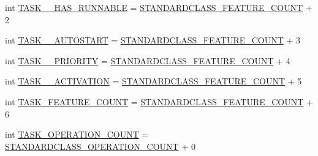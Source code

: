 \begin{DoxyCompactItemize}
\item 
int \hyperlink{interfaceshootingmachineemfmodel_1_1_shootingmachineemfmodel_package_a6dfa46683e73ddc332624916d8e636cf}{T\-A\-S\-K\-\_\-\-\_\-\-H\-A\-S\-\_\-\-R\-U\-N\-N\-A\-B\-L\-E} = \hyperlink{interfaceshootingmachineemfmodel_1_1_shootingmachineemfmodel_package_a14037f66989b3107e402142df96ee9aa}{S\-T\-A\-N\-D\-A\-R\-D\-C\-L\-A\-S\-S\-\_\-\-F\-E\-A\-T\-U\-R\-E\-\_\-\-C\-O\-U\-N\-T} + 2
\item 
int \hyperlink{interfaceshootingmachineemfmodel_1_1_shootingmachineemfmodel_package_aec71228b1f838eaeb86efe350e5b1a4f}{T\-A\-S\-K\-\_\-\-\_\-\-A\-U\-T\-O\-S\-T\-A\-R\-T} = \hyperlink{interfaceshootingmachineemfmodel_1_1_shootingmachineemfmodel_package_a14037f66989b3107e402142df96ee9aa}{S\-T\-A\-N\-D\-A\-R\-D\-C\-L\-A\-S\-S\-\_\-\-F\-E\-A\-T\-U\-R\-E\-\_\-\-C\-O\-U\-N\-T} + 3
\item 
int \hyperlink{interfaceshootingmachineemfmodel_1_1_shootingmachineemfmodel_package_a503bb84ed071da23eaa6ddf93697203e}{T\-A\-S\-K\-\_\-\-\_\-\-P\-R\-I\-O\-R\-I\-T\-Y} = \hyperlink{interfaceshootingmachineemfmodel_1_1_shootingmachineemfmodel_package_a14037f66989b3107e402142df96ee9aa}{S\-T\-A\-N\-D\-A\-R\-D\-C\-L\-A\-S\-S\-\_\-\-F\-E\-A\-T\-U\-R\-E\-\_\-\-C\-O\-U\-N\-T} + 4
\item 
int \hyperlink{interfaceshootingmachineemfmodel_1_1_shootingmachineemfmodel_package_acaa0d423bb2cc890173d67409494bd3d}{T\-A\-S\-K\-\_\-\-\_\-\-A\-C\-T\-I\-V\-A\-T\-I\-O\-N} = \hyperlink{interfaceshootingmachineemfmodel_1_1_shootingmachineemfmodel_package_a14037f66989b3107e402142df96ee9aa}{S\-T\-A\-N\-D\-A\-R\-D\-C\-L\-A\-S\-S\-\_\-\-F\-E\-A\-T\-U\-R\-E\-\_\-\-C\-O\-U\-N\-T} + 5
\item 
int \hyperlink{interfaceshootingmachineemfmodel_1_1_shootingmachineemfmodel_package_a7938b93e2769090ce3b4ef54dfb6345d}{T\-A\-S\-K\-\_\-\-F\-E\-A\-T\-U\-R\-E\-\_\-\-C\-O\-U\-N\-T} = \hyperlink{interfaceshootingmachineemfmodel_1_1_shootingmachineemfmodel_package_a14037f66989b3107e402142df96ee9aa}{S\-T\-A\-N\-D\-A\-R\-D\-C\-L\-A\-S\-S\-\_\-\-F\-E\-A\-T\-U\-R\-E\-\_\-\-C\-O\-U\-N\-T} + 6
\item 
int \hyperlink{interfaceshootingmachineemfmodel_1_1_shootingmachineemfmodel_package_a9b8a8820092643928f0c1ebab194f957}{T\-A\-S\-K\-\_\-\-O\-P\-E\-R\-A\-T\-I\-O\-N\-\_\-\-C\-O\-U\-N\-T} = \hyperlink{interfaceshootingmachineemfmodel_1_1_shootingmachineemfmodel_package_a2fe5d848cfe0a02fe5609e2c5ed7e7c7}{S\-T\-A\-N\-D\-A\-R\-D\-C\-L\-A\-S\-S\-\_\-\-O\-P\-E\-R\-A\-T\-I\-O\-N\-\_\-\-C\-O\-U\-N\-T} + 0
\item 

\end{DoxyCompactItemize}
